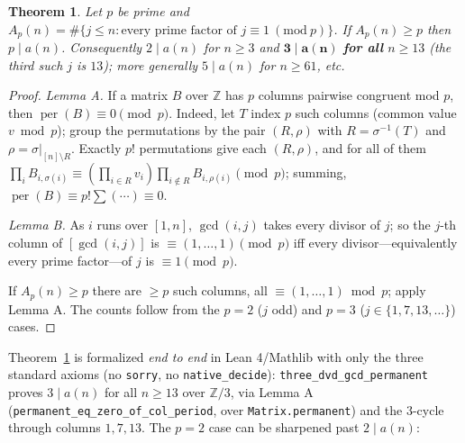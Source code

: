 \documentclass[11pt]{article}
\newtheorem{theorem}{Theorem}
\theoremstyle{remark}\newtheorem{remark}[theorem]{Remark}
\DeclareMathOperator{\perm}{per}
\begin{document}
\begin{theorem}\label{thm:cong}
Let $p$ be prime and $A_p(n)=\#\{j\le n:\text{every prime factor of }j\equiv
1\ (\mathrm{mod}\ p)\}$. If $A_p(n)\ge p$ then $p\mid a(n)$. Consequently
$2\mid a(n)$ for $n\ge 3$ and $\mathbf{3\mid a(n)}$ \textbf{for all} $n\ge 13$
(the third such $j$ is $13$); more generally $5\mid a(n)$ for $n\ge 61$, etc.
\end{theorem}
\begin{proof}
\emph{Lemma A.} If a matrix $B$ over $\mathbb Z$ has $p$ columns pairwise
congruent mod $p$, then $\perm(B)\equiv 0\pmod p$. Indeed, let $T$ index $p$
such columns (common value $v\bmod p$); group the permutations by the pair
$(R,\rho)$ with $R=\sigma^{-1}(T)$ and $\rho=\sigma|_{[n]\setminus R}$. Exactly
$p!$ permutations give each $(R,\rho)$, and for all of them
$\prod_i B_{i,\sigma(i)}\equiv(\prod_{i\in R}v_i)\prod_{i\notin R}B_{i,\rho(i)}
\pmod p$; summing, $\perm(B)\equiv p!\sum(\cdots)\equiv 0$.

\emph{Lemma B.} As $i$ runs over $[1,n]$, $\gcd(i,j)$ takes every divisor of
$j$; so the $j$-th column of $[\gcd(i,j)]$ is $\equiv(1,\dots,1)\pmod p$ iff
every divisor---equivalently every prime factor---of $j$ is $\equiv1\pmod p$.

If $A_p(n)\ge p$ there are $\ge p$ such columns, all $\equiv(1,\dots,1)\bmod p$;
apply Lemma A. The counts follow from the $p=2$ ($j$ odd) and $p=3$
($j\in\{1,7,13,\dots\}$) cases.
\end{proof}
Theorem~\ref{thm:cong} is formalized \emph{end to end} in Lean 4/Mathlib with
only the three standard axioms (no \texttt{sorry}, no \texttt{native\_decide}):
\texttt{three\_dvd\_gcd\_permanent} proves $3\mid a(n)$ for all $n\ge13$ over
$\mathbb Z/3$, via Lemma A (\texttt{permanent\_eq\_zero\_of\_col\_period}, over
\texttt{Matrix.permanent}) and the $3$-cycle through columns $1,7,13$.
The $p=2$ case can be sharpened past $2\mid a(n)$:
\end{document}
